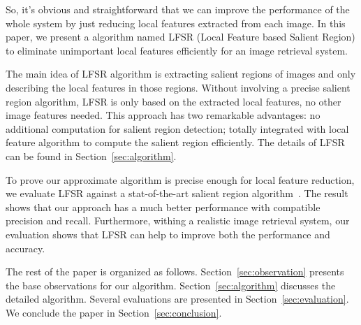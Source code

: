 So, it's obvious and straightforward that we can improve the performance of the whole system by just reducing local features extracted from each image. In this paper, we present a algorithm named LFSR (Local Feature based Salient Region) to eliminate unimportant local features efficiently for an image retrieval system.

The main idea of LFSR algorithm is extracting salient regions of images and only describing the local features in those regions. Without involving a precise salient region algorithm, LFSR is only based on the extracted local features, no other image features needed. This approach has two remarkable advantages: no additional computation for salient region detection; totally integrated with local feature algorithm to compute the salient region efficiently. The details of LFSR can be found in Section~\ref{sec:algorithm}. 

To prove our approximate algorithm is precise enough for local feature reduction, we evaluate LFSR against a stat-of-the-art salient region algorithm~\cite{achanta2009frequency}. The result shows that our approach has a much better performance with compatible precision and recall. Furthermore, withing a realistic image retrieval system, our evaluation shows that LFSR can help to improve both the performance and accuracy.

The rest of the paper is organized as follows. Section~\ref{sec:observation} presents the base observations for our algorithm. Section~\ref{sec:algorithm} discusses the detailed algorithm. Several evaluations are presented in Section~\ref{sec:evaluation}. We conclude the paper in Section~\ref{sec:conclusion}.